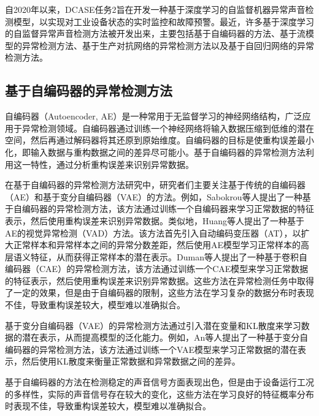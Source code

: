 \documentclass{article}
\begin{document}
自2020年以来，DCASE任务2\cite{DCASE2020Task2,DCASE2021Task2,DCASE2022Task2,DCASE2023Task2}旨在开发一种基于深度学习\cite{DeepLearning-1,DeepLearning-2,DeepLearning-3}的自监督机器异常声音检测模型，以实现对工业设备状态的实时监控和故障预警。最近，许多基于深度学习的自监督异常声音检测方法被开发出来，主要包括基于自编码器的方法\cite{AE-AD,AE-AD-2,CAE-AD,VAE-AD,VAE-AD-2,SAE-AD}、基于流模型的异常检测方法\cite{NF-AD,DifferNet,CFlow-AD}、基于生产对抗网络的异常检测方法\cite{AnoGAN,EGBAD,f-AnoGAN,GANomaly,AEGAN-AD}以及基于自回归网络的异常检测方法\cite{AR-AD,WaveNet-AD}。

\subsection{基于自编码器的异常检测方法}

自编码器（Autoencoder, AE）是一种常用于无监督学习的神经网络结构，广泛应用于异常检测领域。自编码器通过训练一个神经网络将输入数据压缩到低维的潜在空间，然后再通过解码器将其还原到原始维度。自编码器的目标是使重构误差最小化，即输入数据与重构数据之间的差异尽可能小。基于自编码器的异常检测方法利用这一特性，通过分析重构误差来识别异常数据。

在基于自编码器的异常检测方法研究中，研究者们主要关注基于传统的自编码器（AE）\cite{AE-AD}和基于变分自编码器（VAE）\cite{VAE,VAE-AD}的方法。例如，Sabokrou等人\cite{AE-AD}提出了一种基于自编码器的异常检测方法，该方法通过训练一个自编码器来学习正常数据的特征表示，然后使用重构误差来识别异常数据。类似地，Huang等人\cite{AE-AD-2}提出了一种基于AE的视觉异常检测（VAD）方法。该方法首先引入自动编码变压器（AT），以扩大正常样本和异常样本之间的异常分数差距，然后使用AE模型学习正常样本的高层语义特征，从而获得正常样本的潜在表示。Duman等人\cite{CAE-AD}提出了一种基于卷积自编码器（CAE）的异常检测方法，该方法通过训练一个CAE模型来学习正常数据的特征表示，然后使用重构误差来识别异常数据。这些方法在异常检测任务中取得了一定的效果，但是由于自编码器的限制，这些方法在学习复杂的数据分布时表现不佳，导致重构误差较大，模型难以准确拟合。

基于变分自编码器（VAE）的异常检测方法\cite{VAE-AD,VAE-AD-2}通过引入潜在变量和KL散度来学习数据的潜在表示，从而提高模型的泛化能力。例如，An等人\cite{VAE-AD}提出了一种基于变分自编码器的异常检测方法，该方法通过训练一个VAE模型来学习正常数据的潜在表示，然后使用KL散度来衡量正常数据和异常数据之间的差异。


基于自编码器的方法在检测稳定的声音信号方面表现出色，但是由于设备运行工况的多样性，实际的声音信号存在较大的变化，这些方法在学习良好的特征概率分布时表现不佳，导致重构误差较大，模型难以准确拟合\cite{DeepLearning-4}。
\end{document}
